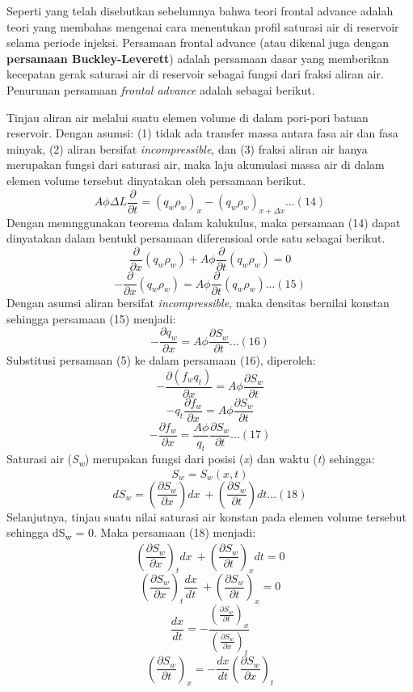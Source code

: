 \documentclass[
]{book}
\begin{document}
Seperti yang telah disebutkan sebelumnya bahwa teori frontal advance adalah teori yang membahas mengenai cara menentukan profil saturasi air di reservoir selama periode injeksi. Persamaan frontal advance (atau dikenal juga dengan \textbf{persamaan Buckley-Leverett}) adalah persamaan dasar yang memberikan kecepatan gerak saturasi air di reservoir sebagai fungsi dari fraksi aliran air. Penurunan persamaan \emph{frontal advance} adalah sebagai berikut.

Tinjau aliran air melalui suatu elemen volume di dalam pori-pori batuan reservoir. Dengan asumsi: (1) tidak ada transfer massa antara fasa air dan fasa minyak, (2) aliran bersifat \emph{incompressible}, dan (3) fraksi aliran air hanya merupakan fungsi dari saturasi air, maka laju akumulasi massa air di dalam elemen volume tersebut dinyatakan oleh persamaan berikut.
\[A\phi\Delta L \frac{\partial}{\partial t} = (q_w\rho_w)_x - (q_w\rho_w)_{x+\Delta x}...(14)\]
Dengan memnggunakan teorema dalam kalukulus, maka persamaan (14) dapat dinyatakan dalam bentukl persamaan diferensioal orde satu sebagai berikut.
\[ \frac{\partial}{\partial x}(q_w\rho_w) + A\phi \frac{\partial}{\partial t}(q_w\rho_w) = 0 \]
\[ -\frac{\partial}{\partial x}(q_w\rho_w) = A\phi \frac{\partial}{\partial t}(q_w\rho_w)...(15) \]
Dengan asumsi aliran bersifat \emph{incompressible}, maka densitas bernilai konstan sehingga persamaan (15) menjadi:
\[ -\frac{\partial q_w}{\partial x} = A\phi \frac{\partial S_w}{\partial t}...(16) \]
Substitusi persamaan (5) ke dalam persamaan (16), diperoleh:
\[ -\frac{\partial (f_wq_t)}{\partial x} = A\phi \frac{\partial S_w}{\partial t} \]
\[ -q_t\frac{\partial f_w}{\partial x} = A\phi \frac{\partial S_w}{\partial t} \]
\[ -\frac{\partial f_w}{\partial x} = \frac{A\phi}{q_t} \frac{\partial S_w}{\partial t} ...(17)\]
Saturasi air (\emph{S\textsubscript{w}}) merupakan fungsi dari posisi (\emph{x}) dan waktu (\emph{t}) sehingga:
\[S_w = S_w(x,t) \]
\[dS_w = \left( \frac{\partial S_w}{\partial x} \right)dx\ + \left( \frac{\partial S_w}{\partial t} \right)dt ... (18)\]
Selanjutnya, tinjau suatu nilai saturasi air konstan pada elemen volume tersebut sehingga dS\textsubscript{w} = 0. Maka persamaan (18) menjadi:
\[\left( \frac{\partial S_w}{\partial x} \right)_tdx\ + \left( \frac{\partial S_w}{\partial t} \right)_xdt = 0\]
\[\left( \frac{\partial S_w}{\partial x} \right)_t \frac{dx}{dt}\ + \left( \frac{\partial S_w}{\partial t} \right)_x = 0\]
\[\frac{dx}{dt} = - \frac{\left( \frac{\partial S_w}{\partial t} \right)_x}{\left( \frac{\partial S_w}{\partial x} \right)_t}\]
\[ \left( \frac{\partial S_w}{\partial t} \right)_x = -\frac{dx}{dt} \left( \frac{\partial S_w}{\partial x} \right)_t \]
\end{document}
